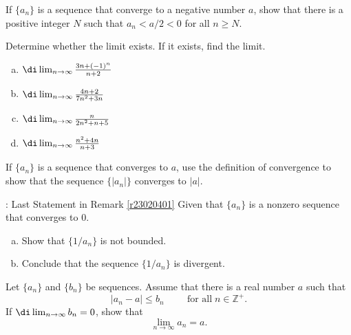 \atc
\begin{question}{\themyquestion}
If $\{a_n\}$ is a sequence that converge to a negative number $a$,   show that there is a positive integer $N$ such that $a_n<a/2<0$ for all $n\geq N$. 
\end{question}
\atc
 \begin{question}{\themyquestion}
Determine whether the limit exists. If it exists, find the limit.
\begin{enumerate}[(a)]
\item
$\di\lim_{n\rightarrow \infty} \frac{3n+(-1)^n}{n+2} $
\item
$\di \lim_{n\rightarrow\infty}\frac{4n+2}{7n^2+3n}$

\item $\di \lim_{n\rightarrow\infty}\frac{n}{2n^2+n+5}$
\item
$\di \lim_{n\rightarrow\infty}\frac{n^2+4n}{n+3}$
\end{enumerate}
\end{question}


\atc

 \begin{question}[label=absolute]{\themyquestion}
If $\{a_n\}$ is a sequence that converges to   $a$, use the definition of convergence to show that the sequence $\{|a_n|\}$ converges to $|a|$. 
\end{question}

\atc



 \begin{question}{\themyquestion:\; Last Statement in Remark \ref{r23020401}}
Given that $\{a_n\}$ is a nonzero sequence that converges to 0.
\begin{enumerate}[(a)]
\item Show that $\{1/a_n\}$ is not bounded.
\item Conclude that the sequence $\{1/a_n\}$ is divergent. 

\end{enumerate}
\end{question}

\atc 
\begin{question}{\themyquestion}
Let $\{a_n\}$ and $\{b_n\}$ be  sequences. Assume that there is a real number $a$ such that
\[|a_n-a|\leq  b_n \hspace{1cm}\text{for all}\;n\in\mathbb{Z}^+.\]
If $\di\lim_{n\rightarrow\infty}b_n=0$, show that
\[\lim_{n\rightarrow\infty}a_n=a.\]
\end{question}

